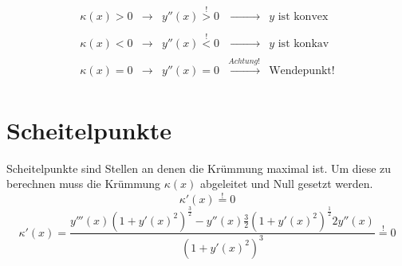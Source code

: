 \[\boxed{\begin{array}{lllll} 
	\kappa (x) > 0 & \rightarrow & y''(x) \stackrel{!}{>} 0 
    & \xrightarrow[]{\phantom{Achtung!}} & y \text{ ist konvex} \\
	\kappa (x) < 0 & \rightarrow & y''(x) \stackrel{!}{<} 0 
    & \xrightarrow[]{\phantom{Achtung!}} & y \text{ ist konkav} \\
	\kappa (x) = 0 & \rightarrow & y''(x) = 0		
    & \xrightarrow[]{Achtung!} & \text{Wendepunkt!}
\end{array}}\]
\section{Scheitelpunkte}
Scheitelpunkte sind Stellen an denen die Krümmung maximal ist. 
Um diese zu berechnen muss die Krümmung $\kappa (x)$ abgeleitet und Null 
gesetzt werden.
\[ \kappa '(x) \stackrel{!}{=} 0  \]
\[ \boxed{\kappa '(x) = \dfrac{ y'''(x)(1+y'(x)^2)^{\frac{3}{2}} - y''(x) 
\frac{3}{2}(1+y'(x)^2)^{\frac{1}{2}} 2y''(x) }{ (1+y'(x)^2)^3 } 
\stackrel{!}{=} 0 } \]
